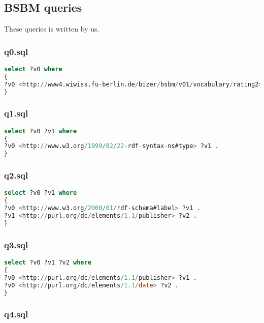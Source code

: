 \documentclass[titlepage, a4paper, 12pt] {article}
\begin{document}
\clearpage

\subsection{BSBM queries}\label{bsbm}

These queries is written by us.

\subsubsection{q0.sql}

\begin{lstlisting}[language=SQL] 
select ?v0 where
{
?v0 <http://www4.wiwiss.fu-berlin.de/bizer/bsbm/v01/vocabulary/rating2> "6"^^<http://www.w3.org/2001/XMLSchema#integer> .
}
\end{lstlisting}

\subsubsection{q1.sql}

\begin{lstlisting}[language=SQL] 
select ?v0 ?v1 where
{
?v0 <http://www.w3.org/1999/02/22-rdf-syntax-ns#type> ?v1 .
}
\end{lstlisting}

\subsubsection{q2.sql}

\begin{lstlisting}[language=SQL] 
select ?v0 ?v1 where
{
?v0 <http://www.w3.org/2000/01/rdf-schema#label> ?v1 .
?v1 <http://purl.org/dc/elements/1.1/publisher> ?v2 .
}
\end{lstlisting}

\subsubsection{q3.sql}

\begin{lstlisting}[language=SQL] 
select ?v0 ?v1 ?v2 where
{
?v0 <http://purl.org/dc/elements/1.1/publisher> ?v1 .
?v0 <http://purl.org/dc/elements/1.1/date> ?v2 .
}
\end{lstlisting}

\subsubsection{q4.sql}
\end{document}
